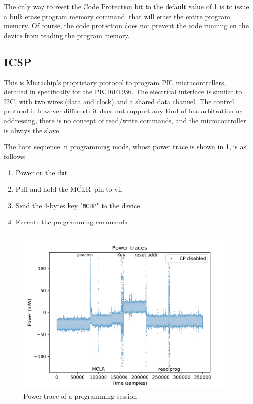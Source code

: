 \documentclass[a4paper,english,twoside,10pt]{article}
\newcommand{\mclr}{\(\overline{\mbox{MCLR}}\)\ }
\begin{document}
The only way to reset the Code Protection bit to the default value of 1 is to issue a bulk erase program memory command, that will erase the entire program memory. Of course, the code protection does not prevent the code running on the device from reading the program memory.

\subsection{ICSP}
This is Microchip's proprietary protocol to program PIC microcontrollers, detailed in \cite{microchip:DS41397B} specifically for the PIC16F1936. The electrical interface is similar to I2C, with two wires (data and clock) and a shared data channel. The control protocol is however different: it does not support any kind of bus arbitration or addressing, there is no concept of read/write commands, and the microcontroller is always the slave.

The boot sequence in programming mode, whose power trace is shown in \cref{fig:powertrace}, is as follows:
\begin{enumerate}
	\item Power on the \gls{dut}
	\item Pull and hold the \mclr pin to \gls{vil}
	\item Send the 4-bytes key "\texttt{MCHP}" to the device
	\item Execute the programming commands
\end{enumerate}

\begin{figure}[htbp]
	\centering%
	\includegraphics[width=.75\textwidth]{seaborn_power_trace.png}
	\caption{Power trace of a programming session}
	\label{fig:powertrace}
\end{figure}
\end{document}
